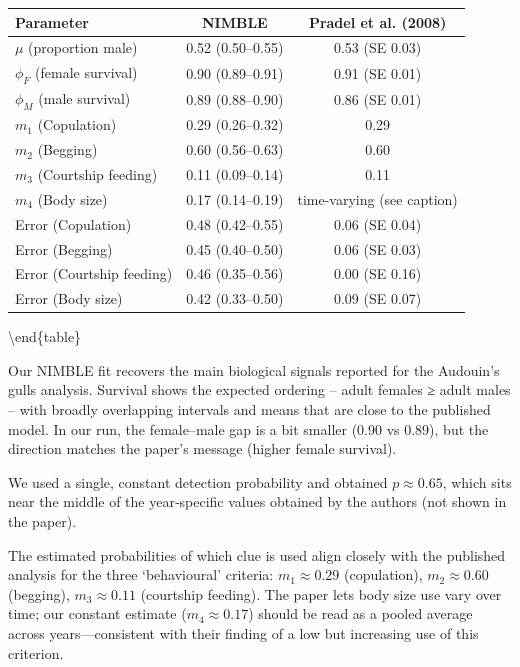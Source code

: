 \documentclass[
  12pt,
]{krantz}
\begin{document}
\begin{tabular}[t]{l|c|c}
\hline
Parameter & NIMBLE & Pradel et al. (2008)\\
\hline
$\mu$ (proportion male) & 0.52 (0.50–0.55) & 0.53 (SE 0.03)\\
\hline
$\phi_F$ (female survival) & 0.90 (0.89–0.91) & 0.91 (SE 0.01)\\
\hline
$\phi_M$ (male survival) & 0.89 (0.88–0.90) & 0.86 (SE 0.01)\\
\hline
$m_1$ (Copulation) & 0.29 (0.26–0.32) & 0.29\\
\hline
$m_2$ (Begging) & 0.60 (0.56–0.63) & 0.60\\
\hline
$m_3$ (Courtship feeding) & 0.11 (0.09–0.14) & 0.11\\
\hline
$m_4$ (Body size) & 0.17 (0.14–0.19) & time-varying (see caption)\\
\hline
Error (Copulation) & 0.48 (0.42–0.55) & 0.06 (SE 0.04)\\
\hline
Error (Begging) & 0.45 (0.40–0.50) & 0.06 (SE 0.03)\\
\hline
Error (Courtship feeding) & 0.46 (0.35–0.56) & 0.00 (SE 0.16)\\
\hline
Error (Body size) & 0.42 (0.33–0.50) & 0.09 (SE 0.07)\\
\hline
\end{tabular}

\textbackslash end\{table\}

Our NIMBLE fit recovers the main biological signals reported for the Audouin's gulls analysis. Survival shows the expected ordering -- adult females ≥ adult males -- with broadly overlapping intervals and means that are close to the published model. In our run, the female--male gap is a bit smaller (0.90 vs 0.89), but the direction matches the paper's message (higher female survival).

We used a single, constant detection probability and obtained \(p \approx 0.65\), which sits near the middle of the year‐specific values obtained by the authors (not shown in the paper).

The estimated probabilities of which clue is used align closely with the published analysis for the three `behavioural' criteria: \(m_1 \approx 0.29\) (copulation), \(m_2 \approx 0.60\) (begging), \(m_3 \approx 0.11\) (courtship feeding). The paper lets body size use vary over time; our constant estimate (\(m_4 \approx 0.17\)) should be read as a pooled average across years---consistent with their finding of a low but increasing use of this criterion.
\end{document}
